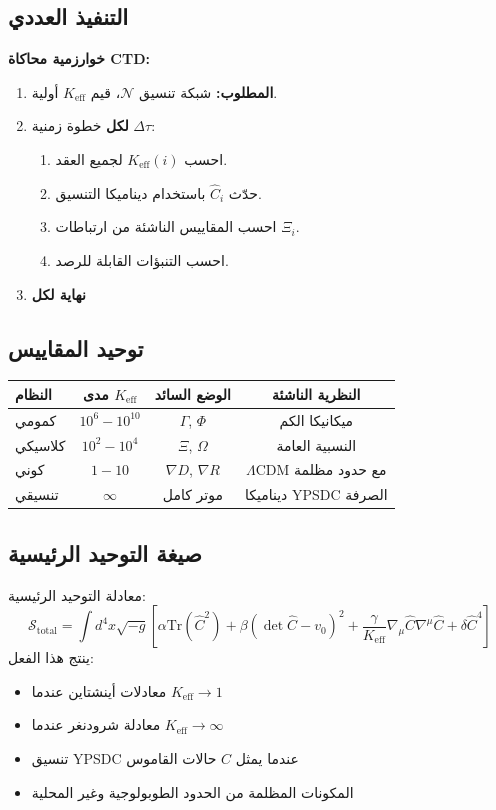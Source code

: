 \documentclass[11pt,a4paper]{article}
\begin{document}
	\subsection{التنفيذ العددي}
	\textbf{خوارزمية محاكاة CTD:}
	\begin{enumerate}
		\item \textbf{المطلوب:} شبكة تنسيق $\mathcal{N}$، قيم $K_{\mathrm{eff}}$ أولية.
		\item \textbf{لكل} خطوة زمنية $\Delta\tau$:
		\begin{enumerate}
			\item احسب $K_{\mathrm{eff}}(i)$ لجميع العقد.
			\item حدّث $\hat{C}_i$ باستخدام ديناميكا التنسيق.
			\item احسب المقاييس الناشئة من ارتباطات $\Xi_i$.
			\item احسب التنبؤات القابلة للرصد.
		\end{enumerate}
		\item \textbf{نهاية لكل}
	\end{enumerate}
	
	\subsection{توحيد المقاييس}
	\begin{table}[htbp]
		\centering
		\begin{english}
			\begin{tabular}{lccc}
				\toprule
				\textbf{النظام} & \textbf{مدى $K_{\mathrm{eff}}$} & \textbf{الوضع السائد} & \textbf{النظرية الناشئة} \\
				\midrule
				كمومي & $10^6-10^{10}$ & $\Gamma$, $\Phi$ & ميكانيكا الكم \\
				كلاسيكي & $10^2-10^4$ & $\Xi$, $\Omega$ & النسبية العامة \\
				كوني & $1-10$ & $\nabla D$, $\nabla R$ & $\Lambda$CDM مع حدود مظلمة \\
				تنسيقي & $\infty$ & موتر كامل & ديناميكا YPSDC الصرفة \\
				\bottomrule
			\end{tabular}
		\end{english}
	\end{table}
	
	\subsection{صيغة التوحيد الرئيسية}
	معادلة التوحيد الرئيسية:
	\[
	\boxed{\mathcal{S}_{\mathrm{total}} = \int d^{4}x \sqrt{-g} \left[ \alpha \mathrm{Tr}(\hat{C}^2) + \beta (\det\hat{C} - v_0)^2 + \frac{\gamma}{K_{\mathrm{eff}}} \nabla_\mu\hat{C}\nabla^\mu\hat{C} + \delta \hat{C}^4 \right]}
	\]
	ينتج هذا الفعل:
	\begin{itemize}
		\item معادلات أينشتاين عندما $K_{\mathrm{eff}} \to 1$
		\item معادلة شرودنغر عندما $K_{\mathrm{eff}} \to \infty$
		\item تنسيق YPSDC عندما يمثل $\hat{C}$ حالات القاموس
		\item المكونات المظلمة من الحدود الطوبولوجية وغير المحلية
	\end{itemize}
	
\end{document}
